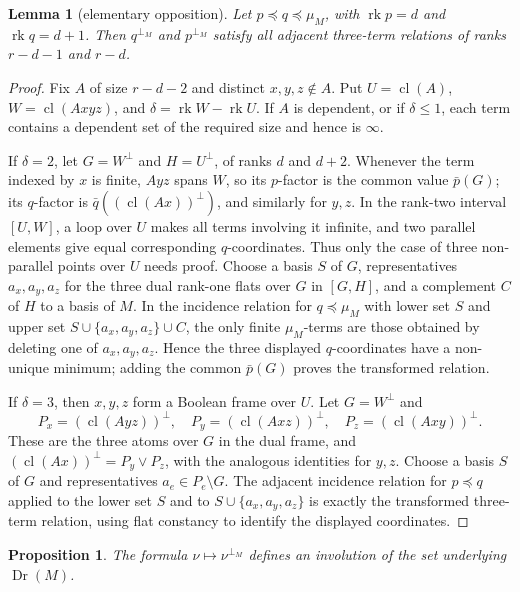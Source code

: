 \documentclass[12pt]{article}
\newcommand{\Dr}{\operatorname{Dr}}
\newcommand{\rk}{\operatorname{rk}}
\newcommand{\cl}{\operatorname{cl}}
\newtheorem{lemma}{Lemma}
\newtheorem{proposition}{Proposition}
\begin{document}
\begin{lemma}[elementary opposition]\label{lem:elementary}
Let $p\preceq q\preceq\mu_M$, with $\rk p=d$ and $\rk q=d+1$.  Then
$q^{\perp_M}$ and $p^{\perp_M}$ satisfy all adjacent three-term
relations of ranks $r-d-1$ and $r-d$.
\end{lemma}

\begin{proof}
Fix $A$ of size $r-d-2$ and distinct $x,y,z\notin A$.  Put
$U=\cl(A)$, $W=\cl(Axyz)$, and $\delta=\rk W-\rk U$.  If $A$ is
dependent, or if $\delta\le1$, each term contains a dependent set of the
required size and hence is $\infty$.

If $\delta=2$, let $G=W^\perp$ and $H=U^\perp$, of ranks $d$ and
$d+2$.  Whenever the term indexed by $x$ is finite, $Ayz$ spans $W$,
so its $p$-factor is the common value $\bar p(G)$; its $q$-factor is
$\bar q((\cl(Ax))^\perp)$, and similarly for $y,z$.  In the rank-two
interval $[U,W]$, a loop over $U$ makes all terms involving it
infinite, and two parallel elements give equal corresponding
$q$-coordinates.  Thus only the case of three non-parallel points over
$U$ needs proof.  Choose a basis $S$ of $G$, representatives
$a_x,a_y,a_z$ for the three dual rank-one flats over $G$ in $[G,H]$,
and a complement $C$ of $H$ to a basis of $M$.  In the incidence
relation for $q\preceq\mu_M$ with lower set $S$ and upper set
$S\cup\{a_x,a_y,a_z\}\cup C$, the only finite $\mu_M$-terms are those
obtained by deleting one of $a_x,a_y,a_z$.  Hence the three displayed
$q$-coordinates have a non-unique minimum; adding the common
$\bar p(G)$ proves the transformed relation.

If $\delta=3$, then $x,y,z$ form a Boolean frame over $U$.  Let
$G=W^\perp$ and
\[
 P_x=(\cl(Ayz))^\perp,\quad P_y=(\cl(Axz))^\perp,\quad
 P_z=(\cl(Axy))^\perp .
\]
These are the three atoms over $G$ in the dual frame, and
$(\cl(Ax))^\perp=P_y\vee P_z$, with the analogous identities for
$y,z$.  Choose a basis $S$ of $G$ and representatives
$a_e\in P_e\setminus G$.  The adjacent incidence relation for
$p\preceq q$ applied to the lower set $S$ and to
$S\cup\{a_x,a_y,a_z\}$ is exactly the transformed three-term relation,
using flat constancy to identify the displayed coordinates.
\end{proof}

\begin{proposition}\label{prop:set}
The formula $\nu\mapsto\nu^{\perp_M}$ defines an involution of the set
underlying $\Dr(M)$.
\end{proposition}
\end{document}
